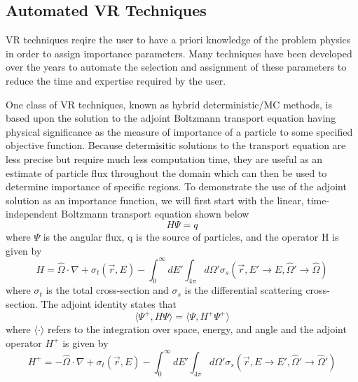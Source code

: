 \subsection{Automated VR Techniques}

VR techniques reqire the user to have a priori knowledge of the problem physics
in order to assign importance parameters.
Many techniques have been developed over the years to automate the selection and
assignment of these parameters to reduce the time and expertise required by
the user.

One class of VR techniques, known as hybrid deterministic/MC methods,
is based upon
the solution to the adjoint Boltzmann transport equation having physical
significance as the measure of importance of a particle to some specified
objective function.  
Because determisitic solutions to the transport equation are less precise but
require much less computation time, they are useful as an estimate of
particle flux throughout the domain which can then be used to determine
importance of specific regions.
To demonstrate the use of the adjoint solution as an importance function,
we will first start with the linear, time-independent Boltzmann transport
equation shown below
\begin{equation} \label{eq:1a}
  H\Psi = q
\end{equation}
where $\Psi$ is the angular flux, q is the source of particles, and the operator H
is given by
\begin{equation} \label{eq:1b}
		H = \widehat{\Omega} \cdot \nabla +
		    \sigma_{t}(\overrightarrow{r},E) - 
			\int_{0}^{\infty} dE'
			\int_{4\pi} d\Omega'
			\sigma_{s}( \overrightarrow{r}, E' 
			\rightarrow E, \widehat{\Omega}' 
			\rightarrow \widehat{\Omega} )
\end{equation}
where $\sigma_{t}$ is the total cross-section and $\sigma_{s}$ is the
differential scattering cross-section.
The adjoint identity states that
\begin{equation} \label{eq:2}
		\langle \Psi^{+} , H\Psi \rangle =
		\langle \Psi, H^{+}\Psi^{+} \rangle
\end{equation}
where $ \langle \cdot \rangle$ refers to the integration over space,
energy, and angle and the adjoint operator $H^{+}$ is given by
\begin{equation} \label{eq:2b}
		H^{+} = -\widehat{\Omega} \cdot \nabla +
		    \sigma_{t}(\overrightarrow{r},E) - 
			\int_{0}^{\infty} dE'
			\int_{4\pi} d\Omega'
			\sigma_{s}( \overrightarrow{r}, E 
			\rightarrow E', \widehat{\Omega}' 
			\rightarrow \widehat{\Omega}' )
\end{equation}
